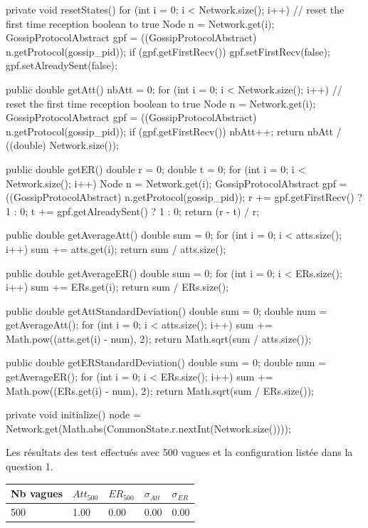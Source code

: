 \documentclass[10pt]{report}
\begin{document}
\begin{boxedlisting}
{	private void resetStates() {
		for (int i = 0; i < Network.size(); i++) { // reset the first time reception boolean to true
			Node n = Network.get(i);
			GossipProtocolAbstract gpf = ((GossipProtocolAbstract) n.getProtocol(gossip_pid));
			if (gpf.getFirstRecv()) {
				gpf.setFirstRecv(false);
				gpf.setAlreadySent(false);
			}
		}
	}

	public double getAtt() {
		nbAtt = 0;
		for (int i = 0; i < Network.size(); i++) { // reset the first time reception boolean to true
			Node n = Network.get(i);
			GossipProtocolAbstract gpf = ((GossipProtocolAbstract) n.getProtocol(gossip_pid));
			if (gpf.getFirstRecv()) {
				nbAtt++;
			}
		}
		return nbAtt / ((double) Network.size());
	}

	public double getER() {
		double r = 0;
		double t = 0;
		for (int i = 0; i < Network.size(); i++) {
			Node n = Network.get(i);
			GossipProtocolAbstract gpf = ((GossipProtocolAbstract) n.getProtocol(gossip_pid));
			r += gpf.getFirstRecv() ? 1 : 0;
			t += gpf.getAlreadySent() ? 1 : 0;
		}
		return (r - t) / r;
	}
	
	public double getAverageAtt() {
		double sum = 0;
		for (int i = 0; i < atts.size(); i++) {sum += atts.get(i);}
		return sum / atts.size();
	}

	public double getAverageER() {
		double sum = 0;
		for (int i = 0; i < ERs.size(); i++) {sum += ERs.get(i);}
		return sum / ERs.size();
	}

	public double getAttStandardDeviation() {
		double sum = 0;
		double num = getAverageAtt();
		for (int i = 0; i < atts.size(); i++) {sum += Math.pow((atts.get(i) - num), 2);}
		return Math.sqrt(sum / atts.size());
	}

	public double getERStandardDeviation() {
		double sum = 0;
		double num = getAverageER();
		for (int i = 0; i < ERs.size(); i++) {sum += Math.pow((ERs.get(i) - num), 2);}
		return Math.sqrt(sum / ERs.size());
	}

	private void initialize() {
		node = Network.get(Math.abs(CommonState.r.nextInt(Network.size())));
	}
}
\end{boxedlisting}

Les résultats des test effectués avec 500 vagues et la configuration listée dans la question 1.\\

\begin{center}
\begin{tabular}{|l|l|l|l|l|}\hline
	Nb vagues & $Att_{500}$ & $ER_{500}$ & $\sigma_{Att}$ & $\sigma_{ER}$\\ \hline
	500 & 1.00 & 0.00 & 0.00 & 0.00 \\ \hline 
\end{tabular}
\end{center}
\end{document}
